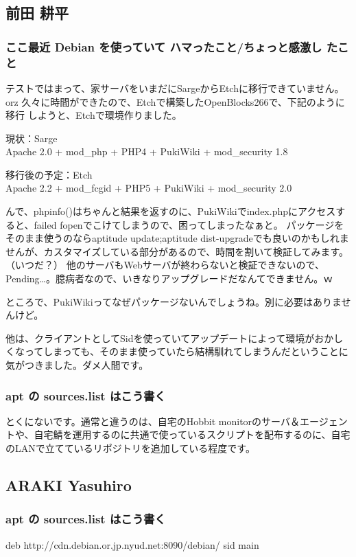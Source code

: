 \documentclass[mingoth,a4paper]{jsarticle}
\begin{document}
\subsection{前田 耕平}

\subsubsection{ここ最近 Debian を使っていて ハマったこと/ちょっと感激し
   たこと}

テストではまって、家サーバをいまだにSargeからEtchに移行できていません。orz
久々に時間ができたので、Etchで構築したOpenBlocks266で、下記のように移行
しようと、Etchで環境作りました。

現状：Sarge\\
Apache 2.0 + mod\_php + PHP4 + PukiWiki + mod\_security 1.8

移行後の予定：Etch\\
Apache 2.2 + mod\_fcgid + PHP5 + PukiWiki + mod\_security 2.0

んで、phpinfo()はちゃんと結果を返すのに、PukiWikiでindex.phpにアクセスすると、failed
fopenでこけてしまうので、困ってしまったなぁと。
パッケージをそのまま使うのならaptitude update;aptitude
dist-upgradeでも良いのかもしれませんが、カスタマイズしている部分があるので、時間を割いて検証してみます。（いつだ？）
他のサーバもWebサーバが終わらないと検証できないので、Pending…。臆病者なので、いきなりアップグレードだなんてできません。ｗ

ところで、PukiWikiってなぜパッケージないんでしょうね。別に必要はありませんけど。


他は、クライアントとしてSidを使っていてアップデートによって環境がおかしくなってしまっても、そのまま使っていたら結構馴れてしまうんだということに気がつきました。ダメ人間です。

\subsubsection{apt の sources.list はこう書く}

とくにないです。通常と違うのは、自宅のHobbit
monitorのサーバ＆エージェントや、自宅鯖を運用するのに共通で使っているスクリプトを配布するのに、自宅のLANで立てているリポジトリを追加している程度です。

\subsection{ARAKI Yasuhiro}

\subsubsection{apt の sources.list はこう書く}
\begin{commandline}
 deb http://cdn.debian.or.jp.nyud.net:8090/debian/ sid main
\end{commandline}
\end{document}
